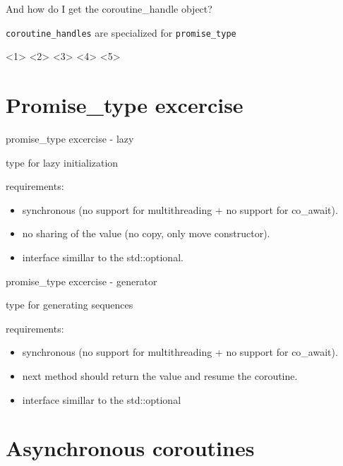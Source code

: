 \documentclass[10pt]{beamer}
\newcommand{\code}[1]{\texttt{#1}}
\begin{document}
\begin{frame}{And how do I get the coroutine\_handle object?}
\centerline{\code{\alert{coroutine\_handles}} are specialized for \code{\alert{promise\_type}}}

  <1>
  <2>
  <3>
  <4>
  <5>


\end{frame}

\section{Promise\_type excercise}

\begin{frame}{promise\_type excercise - lazy}
\centerline{type for lazy initialization}
\vfill
requirements:
\begin{itemize}
  \item synchronous (no support for multithreading + no support for co\_await).
  \item no sharing of the value (no copy, only move constructor).
  \item interface simillar to the std::optional.
\end{itemize}
\end{frame}

\begin{frame}{promise\_type excercise - generator}
  \centerline{type for generating sequences}
  \vfill
  requirements:
  \begin{itemize}
    \item synchronous (no support for multithreading + no support for co\_await).
    \item next method should return the value and resume the coroutine.
    \item interface simillar to the std::optional
  \end{itemize}
\end{frame}

\section{Asynchronous coroutines}
\end{document}
